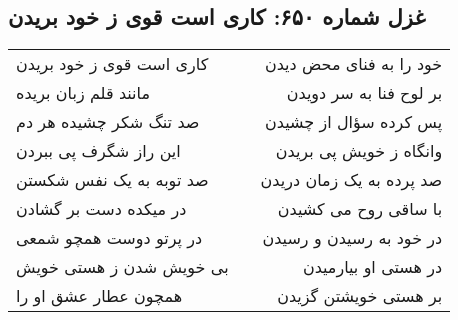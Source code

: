 \begin{center}
\section*{غزل شماره ۶۵۰: کاری است قوی ز خود بریدن}
\label{sec:650}
\begin{longtable}{l p{0.5cm} r}
کاری است قوی ز خود بریدن
&&
خود را به فنای محض دیدن
\\
مانند قلم زبان بریده
&&
بر لوح فنا به سر دویدن
\\
صد تنگ شکر چشیده هر دم
&&
پس کرده سؤال از چشیدن
\\
این راز شگرف پی ببردن
&&
وانگاه ز خویش پی بریدن
\\
صد توبه به یک نفس شکستن
&&
صد پرده به یک زمان دریدن
\\
در میکده دست بر گشادن
&&
با ساقی روح می کشیدن
\\
در پرتو دوست همچو شمعی
&&
در خود به رسیدن و رسیدن
\\
بی خویش شدن ز هستی خویش
&&
در هستی او بیارمیدن
\\
همچون عطار عشق او را
&&
بر هستی خویشتن گزیدن
\\
\end{longtable}
\end{center}
